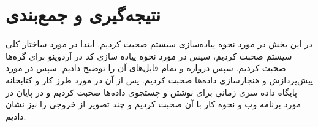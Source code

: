 \section{نتیجه‌گیری و جمع‌بندی}

در این بخش در مورد نحوه پیاده‌سازی سیستم صحبت کردیم. ابتدا در مورد ساختار کلی سیستم صحبت کردیم، سپس در مورد نحوه پیاده سازی کد در آردوینو برای گره‌ها صحبت کردیم. سپس دروازه و تمام فایل‌های آن را توضیح دادیم. سپس در مورد پیش‌پردازش و هنجارسازی داده‌ها صحبت کردیم. پس از آن در مورد طرز کار و کتابخانه پایگاه داده سری زمانی برای نوشتن و چستجوی داده‌ها صحبت کردیم و در پایان در مورد برنامه وب و نحوه کار با آن صحبت کردیم و چند تصویر از خروجی را نیز نشان دادیم.
